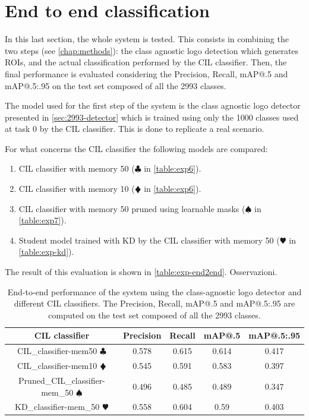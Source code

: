 \section{End to end classification}
\label{sec:exp-end2end}

In this last section, the whole system is tested. This consists in combining the two steps (see \autoref{chap:methods}): the class agnostic logo detection which generates ROIs, and the actual classification performed by the CIL classifier.
Then, the final performance is evaluated considering the Precision, Recall, mAP@.5 and mAP@.5:.95 on the test set composed of all the 2993 classes.

The model used for the first step of the system is the class agnostic logo detector presented in \autoref{sec:2993-detector} which is trained using only the 1000 classes used at task 0 by the CIL classifier.
This is done to replicate a real scenario.

For what concerns the CIL classifier the following models are compared:
\begin{enumerate}
    \item CIL classifier with memory 50 ($\clubsuit$ in \autoref{table:exp6}).
    \item CIL classifier with memory 10 ($\vardiamondsuit$ in \autoref{table:exp6}).
    \item CIL classifier with memory 50 pruned using learnable masks ($\spadesuit$ in \autoref{table:exp7}).
    \item Student model trained with KD by the CIL classifier with memory 50 ($\varheartsuit$ in \autoref{table:exp-kd}).
\end{enumerate}

The result of this evaluation is shown in \autoref{table:exp-end2end}. Osservazioni.

\begin{table}[H]
    \centering
    \begin{tabular}{c|c|c|c|c}
        \hline
        \textbf{CIL classifier} &
        \textbf{Precision} &
        \textbf{Recall} &
        \textbf{mAP@.5} &
        \textbf{mAP@.5:.95} \\
        \hline
        \hline
CIL\_classifier-mem50 $\clubsuit$&0.578&0.615&0.614&0.417\\
CIL\_classifier-mem10 $\vardiamondsuit$&0.545&0.591&0.583&0.397\\
Pruned\_CIL\_classifier-mem\_50 $\spadesuit$&0.496&0.485&0.489&0.347\\
KD\_classifier-mem\_50 $\varheartsuit$&0.558&0.604&0.59&0.403\\
\hline
\end{tabular}
\caption{End-to-end performance of the system using the class-agnostic logo detector and different CIL classifiers. The Precision, Recall, mAP@.5 and mAP@.5:.95 are computed on the test set composed of all the 2993 classes.}
    \label{table:exp-end2end}
\end{table}
